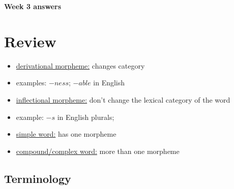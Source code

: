 \documentclass[a4paper,11pt]{article}
\begin{document}
\begin{center}
\Large{\textbf{Week 3 answers}}
\end{center}


\section{Review}

\begin{itemize}
\item \underline{derivational morpheme:} changes category 
\item[] \hspace{1cm} examples: $-ness$; $-able$ in English
\item \underline{inflectional morpheme:}  don't change the lexical category of the word 
\item[] \hspace{1cm} example: $-s$ in English plurals; 
\item \underline{simple word:} has one morpheme 
\item \underline{compound/complex word:} more than one morpheme
\end{itemize}


\subsection{Terminology}
\end{document}

